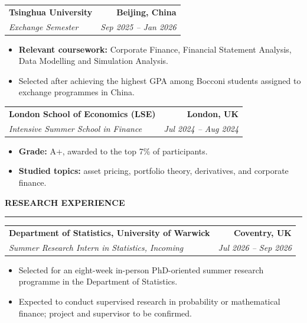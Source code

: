 \documentclass[10pt,letterpaper]{article}
\makeatletter
\newcommand{\cvsection}[1]{%
    \vspace{5pt}%
    {\large\textbf{\MakeUppercase{#1}}}%
    \vspace{2pt}
    \hrule%
    \vspace{5pt}%
}
\newcommand{\cventry}[4]{%
    \vspace{4pt}%
    \noindent
    \begin{tabular*}{\textwidth}{@{}l@{\extracolsep{\fill}}r@{}}
        \large{\textbf{#1}} & \textbf{#2} \\
        \textit{#3} & \textit{#4}
    \end{tabular*}%
    \par\vspace{-2pt}%
}
\newenvironment{cvitems}{%
    \begin{itemize}[
        leftmargin=1.5em,
        itemsep=2pt,
        topsep=5pt,
        parsep=0pt,
        partopsep=0pt
    ]
}{%
    \end{itemize}
}
\makeatother
\begin{document}
\cventry
{Tsinghua University}
{Beijing, China}
{Exchange Semester \normalfont{-- \textbf{GPA:} 4.0/4.0}}
{Sep 2025 -- Jan 2026}

\begin{cvitems}

    \item \textbf{Relevant coursework:} Corporate Finance, Financial Statement Analysis, Data Modelling and Simulation Analysis.
    
    \item Selected after achieving the highest GPA among Bocconi students assigned to exchange programmes in China.
    
\end{cvitems}

\cventry
{London School of Economics (LSE)}
{London, UK}
{Intensive Summer School in Finance}
{Jul 2024 -- Aug 2024}

\begin{cvitems}

    \item \textbf{Grade:} A+, awarded to the top 7\% of participants.
    
    \item \textbf{Studied topics:} asset pricing, portfolio theory, derivatives, and corporate finance.
    
\end{cvitems}




\cvsection{Research Experience}

\cventry
{Department of Statistics, University of Warwick}
{Coventry, UK}
{Summer Research Intern in Statistics, Incoming}
{Jul 2026 -- Sep 2026}

\begin{cvitems}

    \item Selected for an eight-week in-person PhD-oriented summer research programme in the Department of Statistics.
    
    \item Expected to conduct supervised research in probability or mathematical finance; project and supervisor to be confirmed.
    
\end{cvitems}
\end{document}
